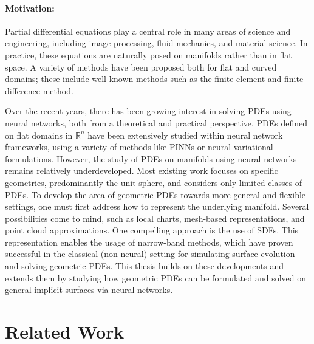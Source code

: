 \documentclass[12pt,openany]{book}
\newcommand{\R}{\mathbb{R}}
\theoremstyle{plainnormal}
\theoremstyle{remark}
\begin{document}
\paragraph{Motivation:} Partial differential equations play a central role in many areas of science and engineering, including image processing, fluid mechanics, and material science. In practice, these equations are naturally posed on manifolds rather than in flat space. A variety of methods have been proposed both for flat and curved domains; these include well-known methods such as the finite element and finite difference method. \par
Over the recent years, there has been growing interest in solving PDEs using neural networks, both from a theoretical and practical perspective. PDEs defined on flat domains in $\R^n$ have been extensively studied within neural network frameworks, using a variety of methods like PINNs or neural-variational formulations. However, the study of PDEs on manifolds using neural networks remains relatively underdeveloped. Most existing work focuses on specific geometries, predominantly the unit sphere, and considers only limited classes of PDEs.
To develop the area of geometric PDEs towards more general and flexible settings, one must first address how to represent the underlying manifold. Several possibilities come to mind, such as local charts, mesh-based representations, and point cloud approximations. One compelling approach is the use of SDFs. This representation enables the usage of narrow-band methods, which have proven successful in the classical (non-neural) setting for simulating surface evolution and solving geometric PDEs.
This thesis builds on these developments and extends them by studying how geometric PDEs can be formulated and solved on general implicit surfaces via neural networks.
\section{Related Work}
\end{document}
